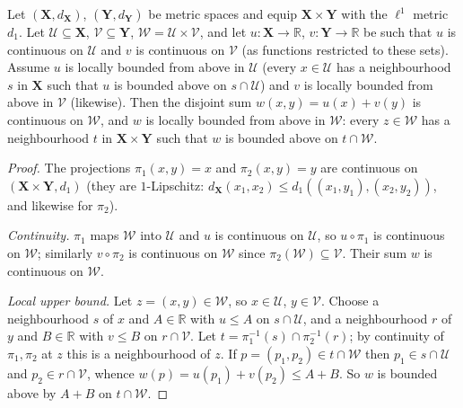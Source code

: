 \begin{lemma}
Let $(\mathbf X,d_{\mathbf X})$, $(\mathbf Y,d_{\mathbf Y})$ be metric spaces and equip $\mathbf X\times\mathbf Y$ with the $\ell^1$ metric $d_1$. Let $\mathcal U\subseteq\mathbf X$, $\mathcal V\subseteq\mathbf Y$, $\mathcal W=\mathcal U\times\mathcal V$, and let $u:\mathbf X\to\mathbb R$, $v:\mathbf Y\to\mathbb R$ be such that $u$ is continuous on $\mathcal U$ and $v$ is continuous on $\mathcal V$ (as functions restricted to these sets). Assume $u$ is locally bounded from above in $\mathcal U$ (every $x\in\mathcal U$ has a neighbourhood $s$ in $\mathbf X$ such that $u$ is bounded above on $s\cap\mathcal U$) and $v$ is locally bounded from above in $\mathcal V$ (likewise). Then the disjoint sum $w(x,y)=u(x)+v(y)$ is continuous on $\mathcal W$, and $w$ is locally bounded from above in $\mathcal W$: every $z\in\mathcal W$ has a neighbourhood $t$ in $\mathbf X\times\mathbf Y$ such that $w$ is bounded above on $t\cap\mathcal W$.
\end{lemma}
\begin{proof}
The projections $\pi_1(x,y)=x$ and $\pi_2(x,y)=y$ are continuous on $(\mathbf X\times\mathbf Y,d_1)$ (they are $1$-Lipschitz: $d_{\mathbf X}(x_1,x_2)\le d_1((x_1,y_1),(x_2,y_2))$, and likewise for $\pi_2$).

\emph{Continuity.} $\pi_1$ maps $\mathcal W$ into $\mathcal U$ and $u$ is continuous on $\mathcal U$, so $u\circ\pi_1$ is continuous on $\mathcal W$; similarly $v\circ\pi_2$ is continuous on $\mathcal W$ since $\pi_2(\mathcal W)\subseteq\mathcal V$. Their sum $w$ is continuous on $\mathcal W$.

\emph{Local upper bound.} Let $z=(x,y)\in\mathcal W$, so $x\in\mathcal U$, $y\in\mathcal V$. Choose a neighbourhood $s$ of $x$ and $A\in\mathbb R$ with $u\le A$ on $s\cap\mathcal U$, and a neighbourhood $r$ of $y$ and $B\in\mathbb R$ with $v\le B$ on $r\cap\mathcal V$. Let $t=\pi_1^{-1}(s)\cap\pi_2^{-1}(r)$; by continuity of $\pi_1,\pi_2$ at $z$ this is a neighbourhood of $z$. If $p=(p_1,p_2)\in t\cap\mathcal W$ then $p_1\in s\cap\mathcal U$ and $p_2\in r\cap\mathcal V$, whence $w(p)=u(p_1)+v(p_2)\le A+B$. So $w$ is bounded above by $A+B$ on $t\cap\mathcal W$.
\end{proof}
